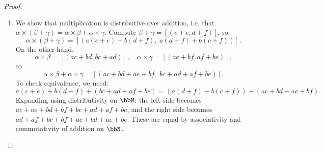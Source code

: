 \begin{proof}
\begin{enumerate}
\begin{itemize}
        To check equivalence, we need the sum of the first component of $(\alpha\times\beta)\times\gamma$ and the second component of $\alpha\times(\beta\times\gamma)$ to equal the sum of the second component of $(\alpha\times\beta)\times\gamma$ and the first component of $\alpha\times(\beta\times\gamma)$:
        \begin{align*}
        &\quad (ace + bde + bcf + adf) + (acf + ade + bce + bdf) \\
        &= ace + bde + bcf + adf + acf + ade + bce + bdf \\
        &= acf + bdf + bce + ade + ace + adf + bcf + bde \\
        &= (acf + bdf + bce + ade) + (ace + adf + bcf + bde),
        \end{align*}
        where the rearrangement uses only associativity and commutativity of addition on $\bbN$. Hence $(\alpha\times\beta)\times\gamma = \alpha\times(\beta\times\gamma)$.

    \end{itemize}

    \item We show that multiplication is distributive over addition, i.e. that $\alpha \times (\beta + \gamma) = \alpha \times \beta + \alpha \times \gamma$.
    Compute $\beta + \gamma = [(c+e, d+f)]$, so
    $$\alpha \times (\beta + \gamma) = [(a(c+e) + b(d+f),\; a(d+f) + b(c+f))].$$
    On the other hand,
    $$\alpha \times \beta = [(ac+bd, bc+ad)], \quad \alpha \times \gamma = [(ae+bf, af+be)],$$
    so
    $$\alpha \times \beta + \alpha \times \gamma = [(ac+bd+ae+bf,\; bc+ad+af+be)].$$
    To check equivalence, we need:
    $$a(c+e) + b(d+f) + (bc+ad+af+be) = (a(d+f) + b(c+f)) + (ac+bd+ae+bf).$$
    Expanding using distributivity on $\bbN$: the left side becomes $ac+ae+bd+bf+bc+ad+af+be$, and the right side becomes $ad+af+bc+bf+ac+bd+ae+be$. These are equal by associativity and commutativity of addition on $\bbN$.


\end{enumerate}
\end{proof}
